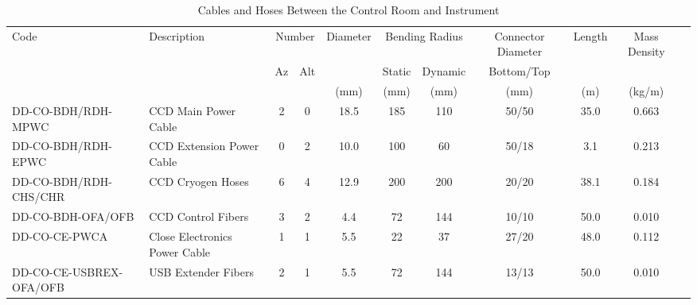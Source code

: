 \documentclass{article}
\begin{document}
%
%
%
%

\begin{landscape}
\begin{table}[p]
\caption{Cables and Hoses Between the Control Room and Instrument}
\label{table:cables}
\begin{center}
\footnotesize
\begin{tabular}{llccccccccc}
\hline
Code&Description&\multicolumn{2}{c}{Number}&Diameter&\multicolumn{2}{c}{Bending Radius}&Connector Diameter&Length&Mass Density\\
&&Az&Alt&&Static&Dynamic&Bottom/Top&\\
&&&&(mm)&(mm)&(mm)&(mm)&(m)&(kg/m)\\
\hline
DD-CO-BDH/RDH-MPWC&CCD Main Power Cable &2&0&18.5&185&110&50/50&35.0&0.663\\
DD-CO-BDH/RDH-EPWC&CCD Extension Power Cable&0&2&10.0&100&60&50/18&\phantom{0}3.1&0.213\\
DD-CO-BDH/RDH-CHS/CHR&CCD Cryogen Hoses&6&4&12.9&200&200&20/20&38.1&0.184\\
DD-CO-BDH-OFA/OFB&CCD Control Fibers&3&2&\phantom{0}4.4&\phantom{0}72&144&10/10&50.0&0.010\\
DD-CO-CE-PWCA&Close Electronics Power Cable&1&1&\phantom{0}5.5&\phantom{0}22&\phantom{0}37&27/20&48.0&0.112\\
DD-CO-CE-USBREX-OFA/OFB&USB Extender Fibers&2&1&\phantom{0}5.5&\phantom{0}72&144&13/13&50.0&0.010\\
\hline
\end{tabular}
\end{center}
\end{table}
\end{landscape}
\end{document}
